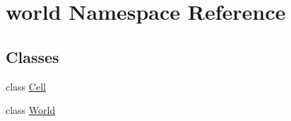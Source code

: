 \hypertarget{namespaceworld}{\section{world Namespace Reference}
\label{namespaceworld}
}
\subsection*{Classes}
\begin{DoxyCompactItemize}
\item 
class \hyperlink{classworld_1_1Cell}{Cell}
\item 
class \hyperlink{classworld_1_1World}{World}
\end{DoxyCompactItemize}
